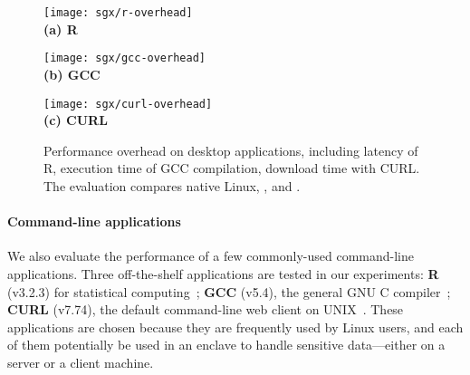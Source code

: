\begin{figure*}[t!]
	\centering
	
	\begin{minipage}{.65\textwidth}
		\centering
		\footnotesize
		\vspace{6pt}
		\texttt{[image: sgx/r-overhead]}\\
		\vspace{3pt}
		{\bf (a) R}
		\vspace{6pt}
	\end{minipage}
	\begin{minipage}{.42\textwidth}
		\centering
		\footnotesize
		\vspace{6pt}
		\texttt{[image: sgx/gcc-overhead]}\\
		\vspace{3pt}
		{\bf (b) GCC}
		\vspace{6pt}
	\end{minipage}
	\begin{minipage}{.38\textwidth}
		\centering
		\footnotesize
		\vspace{6pt}
		\texttt{[image: sgx/curl-overhead]}\\
		\vspace{3pt}
		{\bf (c) CURL}
		\vspace{6pt}
	\end{minipage}
	
	\caption{Performance overhead on desktop applications, including latency of R, execution time of GCC compilation, download time with CURL. The evaluation compares native Linux, \graphene{}, and \graphenesgx{}.} %
	\label{fig:desktop-overhead}
\end{figure*}



\paragraph{Command-line applications}


We also evaluate the performance of a few commonly-used command-line applications.
Three off-the-shelf applications are tested in our experiments:
{\bf R} (v3.2.3) for statistical computing~\cite{r-project}; {\bf GCC} (v5.4), the general GNU C compiler~\cite{gcc}; {\bf CURL} (v7.74), the default command-line web client on UNIX~\cite{curl}.
These applications are chosen because they are frequently used by Linux users,
and each of them potentially  be used 
in an enclave to handle sensitive data---either on a server or a client
machine.



